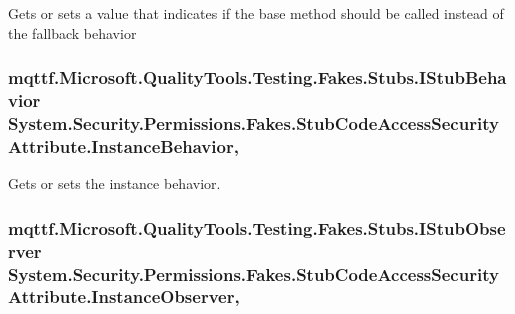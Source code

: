 Gets or sets a value that indicates if the base method should be called instead of the fallback behavior

\hypertarget{class_system_1_1_security_1_1_permissions_1_1_fakes_1_1_stub_code_access_security_attribute_a0955f401611ebe28f7a40d26bcbde1af}{
\subsubsection[{Instance\-Behavior}]{\setlength{\rightskip}{0pt plus 5cm}mqttf.\-Microsoft.\-Quality\-Tools.\-Testing.\-Fakes.\-Stubs.\-I\-Stub\-Behavior System.\-Security.\-Permissions.\-Fakes.\-Stub\-Code\-Access\-Security\-Attribute.\-Instance\-Behavior\hspace{0.3cm}{\ttfamily [get]}, {\ttfamily [set]}}}\label{class_system_1_1_security_1_1_permissions_1_1_fakes_1_1_stub_code_access_security_attribute_a0955f401611ebe28f7a40d26bcbde1af}


Gets or sets the instance behavior.

\hypertarget{class_system_1_1_security_1_1_permissions_1_1_fakes_1_1_stub_code_access_security_attribute_a29a4f4d03060d43451870477e1c427fa}{
\subsubsection[{Instance\-Observer}]{\setlength{\rightskip}{0pt plus 5cm}mqttf.\-Microsoft.\-Quality\-Tools.\-Testing.\-Fakes.\-Stubs.\-I\-Stub\-Observer System.\-Security.\-Permissions.\-Fakes.\-Stub\-Code\-Access\-Security\-Attribute.\-Instance\-Observer\hspace{0.3cm}{\ttfamily [get]}, {\ttfamily [set]}}}\label{class_system_1_1_security_1_1_permissions_1_1_fakes_1_1_stub_code_access_security_attribute_a29a4f4d03060d43451870477e1c427fa}


